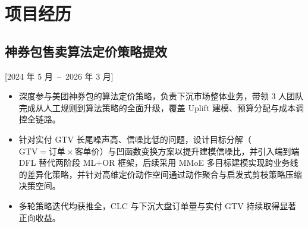 \documentclass{mycv}
\begin{document}




\section{项目经历}

\subsection{神券包售卖算法定价策略提效}[2024 年 5 月~--~2026 年 3 月]

\begin{itemize}
  \itemsep 0.4em
  \item 深度参与美团神券包的算法定价策略，负责下沉市场整体业务，带领 3 人团队完成从人工规则到算法策略的全面升级，覆盖 Uplift 建模、预算分配与成本调控全链路。
  \item 针对实付 GTV 长尾噪声高、信噪比低的问题，设计目标分解（$\text{GTV} = \text{订单} \times \text{客单价}$）与凹函数变换方案以提升建模信噪比，并引入端到端 DFL 替代两阶段 ML+OR 框架，后续采用 MMoE 多目标建模实现跨业务线的差异化策略，并针对高维定价动作空间通过动作聚合与启发式剪枝策略压缩决策空间。
  \item 多轮策略迭代均获推全，CLC 与下沉大盘订单量与实付 GTV 持续取得显著正向收益。
\end{itemize}

\end{document}
